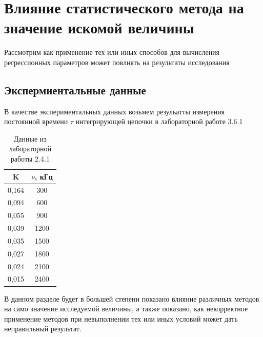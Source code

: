 \documentclass[a4paper,20pt]{article}
\theoremstyle{definition}
\begin{document}
\newpage
\section{Влияние статистического метода на значение искомой величины}
Рассмотрим как применение тех или иных способов для вычисления регрессионных параметров может повлиять на результаты исследования
\subsection{Экспермиентальные данные}
В качестве экспериментальных данных возьмем резульатты измерения постоянной времени $\tau$ интегрирующей цепочки в лабораторной работе 3.6.1
\begin{table}[H]
	\centering
	\begin{tabular}{|c|c|}
		\hline
		K& $\nu$, кГц \\ \hline
		0,164 & 300      \\ \hline
		0,094 & 600      \\ \hline
		0,055 & 900      \\ \hline
		0,039 & 1200      \\ \hline
		0,035 & 1500      \\ \hline
		0,027 & 1800      \\ \hline
		0,024 & 2100      \\ \hline
		0,015 & 2400      \\ \hline
	\end{tabular}
	\caption{Данные из лабораторной работы 2.4.1}
	\label{tab:izm}

\end{table}
В данном разделе будет в большей степени показано влияние различных методов на само значение исследуемой величины, а также показано, как некорректное применение методов
при невыполнении тех или иных условий может дать неправильный результат.
\end{document}
